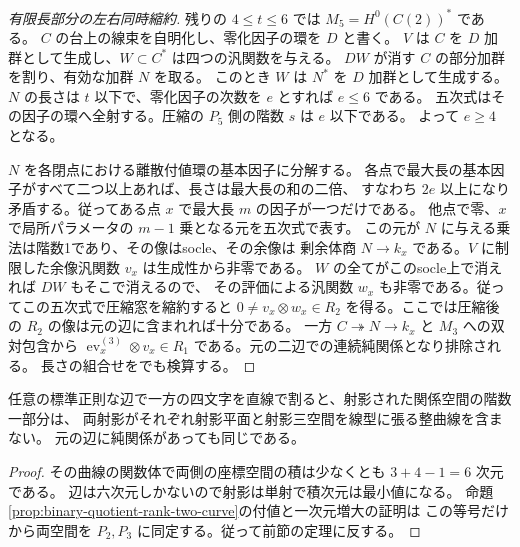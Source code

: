 \begin{proof}[有限長部分の左右同時縮約]
残りの $4\le t\le6$ では $M_5=H^0(C(2))^*$ である。
$C$ の台上の線束を自明化し、零化因子の環を $D$ と書く。
$V$ は $C$ を $D$ 加群として生成し、$W\subset C^*$ は四つの汎関数を与える。
$DW$ が消す $C$ の部分加群を割り、有効な加群 $N$ を取る。
このとき $W$ は $N^*$ を $D$ 加群として生成する。
$N$ の長さは $t$ 以下で、零化因子の次数を $e$ とすれば $e\le6$ である。
五次式はその因子の環へ全射する。圧縮の $P_5$ 側の階数 $s$ は $e$ 以下である。
よって $e\ge4$ となる。

$N$ を各閉点における離散付値環の基本因子に分解する。
各点で最大長の基本因子がすべて二つ以上あれば、長さは最大長の和の二倍、
すなわち $2e$ 以上になり矛盾する。従ってある点 $x$ で最大長 $m$ の因子が一つだけである。
他点で零、$x$ で局所パラメータの $m-1$ 乗となる元を五次式で表す。
この元が $N$ に与える乗法は階数1であり、その像はsocle、その余像は
剰余体商 $N\to k_x$ である。$V$ に制限した余像汎関数 $v_x$ は生成性から非零である。
$W$ の全てがこのsocle上で消えれば $DW$ もそこで消えるので、
その評価による汎関数 $w_x$ も非零である。従ってこの五次式で圧縮窓を縮約すると
$0\ne v_x\otimes w_x\in R_2$ を得る。ここでは圧縮後の $R_2$ の像は元の辺に含まれれば十分である。
一方 $C\twoheadrightarrow N\to k_x$ と $M_3$ への双対包含から
$\operatorname{ev}_x^{(3)}\otimes v_x\in R_1$ である。元の二辺での連続純関係となり排除される。
長さの組合せをでも検算する。
\end{proof}

\begin{corollary}\label{cor:no-full-pure-projected-curve}
任意の標準正則な辺で一方の四文字を直線で割ると、射影された関係空間の階数一部分は、
両射影がそれぞれ射影平面と射影三空間を線型に張る整曲線を含まない。
元の辺に純関係があっても同じである。
\end{corollary}
\begin{proof}
その曲線の関数体で両側の座標空間の積は少なくとも $3+4-1=6$ 次元である。
辺は六次元しかないので射影は単射で積次元は最小値になる。
命題\ref{prop:binary-quotient-rank-two-curve}の付値と一次元増大の証明は
この等号だけから両空間を $P_2,P_3$ に同定する。従って前節の定理に反する。
\end{proof}
